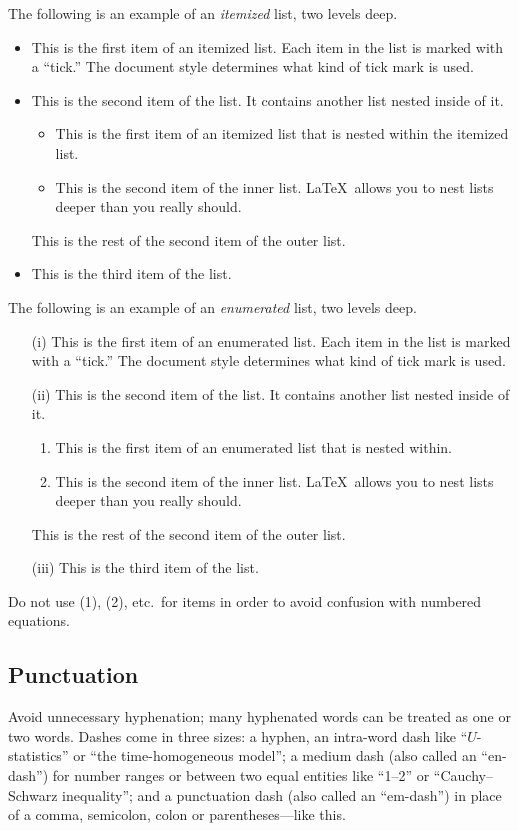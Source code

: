 \documentclass[ecta,nameyear,draft]{econsocart}
\theoremstyle{plain}
\theoremstyle{remark}
\begin{document}
The following is an example of an \emph{itemized} list,
two levels deep.
\begin{itemize}
\item
This is the first item of an itemized list.  Each item
in the list is marked with a ``tick.''  The document
style determines what kind of tick mark is used.
\item
This is the second item of the list.  It contains another
list nested inside of it.
\begin{itemize}
\item This is the first item of an itemized list that
is nested within the itemized list.
\item This is the second item of the inner list.  \LaTeX\
allows you to nest lists deeper than you really should.
\end{itemize}
This is the rest of the second item of the outer list.
\item
This is the third item of the list.
\end{itemize}

The following is an example of an \emph{enumerated} list, two levels deep.
\begin{enumerate}[(ii)]
\item[(i)]
This is the first item of an enumerated list.  Each item
in the list is marked with a ``tick.''  The document
style determines what kind of tick mark is used.
\item[(ii)]
This is the second item of the list.  It contains another
list nested inside of it.
\begin{enumerate}
\item
This is the first item of an enumerated list that
is nested within.
\item
This is the second item of the inner list.  \LaTeX\
allows you to nest lists deeper than you really should.
\end{enumerate}
This is the rest of the second item of the outer list.
\item [(iii)]
This is the third item of the list.
\end{enumerate}

Do not use (1), (2), etc.\ for items in order to avoid confusion with numbered equations.

\subsection{Punctuation}
Avoid unnecessary hyphenation; many hyphenated words can be treated as one or two words.
Dashes come in three sizes: a hyphen, an intra-word dash like ``$U$-statistics'' or ``the time-homogeneous model'';
a medium dash (also called an ``en-dash'') for number ranges or between two equal entities like ``1--2'' or ``Cauchy--Schwarz inequality'';
and a punctuation dash (also called an ``em-dash'') in place of a comma, semicolon,
colon or parentheses---like this.
\end{document}
